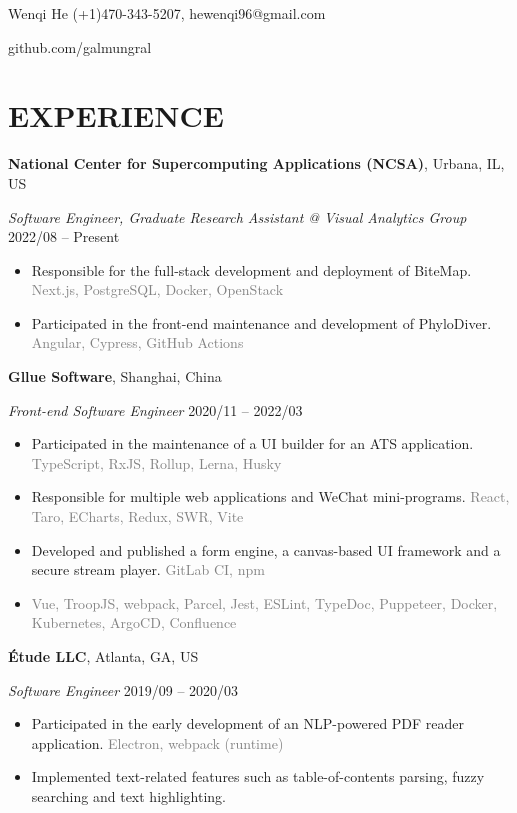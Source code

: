 \documentclass[10pt]{article}
\begin{document}
{\huge Wenqi He} \hfill (+1)470-343-5207, hewenqi96@gmail.com

\hfill github.com/galmungral

\section*{EXPERIENCE}
\textbf{National Center for Supercomputing Applications (NCSA)}, Urbana, IL, US

\textit{Software Engineer, Graduate Research Assistant @ Visual Analytics Group} \hfill 2022/08 -- Present

\begin{itemize}[itemsep=0pt, topsep=4pt, label=-]
\item Responsible for the full-stack development and deployment of BiteMap. \hfill \textcolor{gray}{Next.js, PostgreSQL, Docker, OpenStack}
\item Participated in the front-end maintenance and development of PhyloDiver. \hfill \textcolor{gray}{Angular, Cypress, GitHub Actions}
\end{itemize}

\vspace{0.5em}
\textbf{Gllue Software}, Shanghai, China

\textit{Front-end Software Engineer}  \hfill 2020/11 -- 2022/03

\begin{itemize}[itemsep=0pt, topsep=4pt, label=-]
\item Participated in the maintenance of a UI builder for an ATS application. \hfill \textcolor{gray}{TypeScript, RxJS, Rollup, Lerna, Husky}
\item Responsible for multiple web applications and WeChat mini-programs. \hfill \textcolor{gray}{React, Taro, ECharts, Redux, SWR, Vite}
\item Developed and published a form engine, a canvas-based UI framework and a secure stream player. \hfill \textcolor{gray}{GitLab CI, npm}
\item \hfill \textcolor{gray}{Vue, TroopJS, webpack, Parcel, Jest, ESLint, TypeDoc, Puppeteer, Docker, Kubernetes, ArgoCD, Confluence}
\end{itemize}
\vspace{0.5em}
\textbf{Étude LLC}, Atlanta, GA, US

\textit{Software Engineer} \hfill 2019/09 -- 2020/03

\begin{itemize}[itemsep=0pt, topsep=4pt, label=-]
\item Participated in the early development of an NLP-powered PDF reader application. \hfill \textcolor{gray}{Electron, webpack (runtime)}
\item Implemented text-related features such as table-of-contents parsing, fuzzy searching and text highlighting.
\end{itemize}
\end{document}
